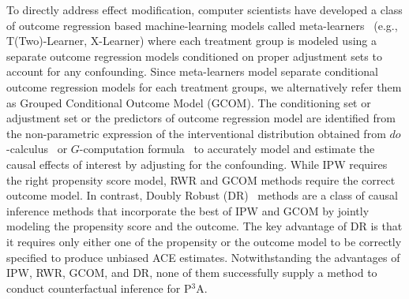 \documentclass[letterpaper]{article} %
\begin{document}
To directly address effect modification, computer scientists have developed a class of outcome regression based machine-learning models called meta-learners~\cite{kunzel2019metalearners} (e.g., T(Two)-Learner, X-Learner) where each treatment group is modeled using a separate outcome regression models conditioned on proper adjustment sets to account for any confounding.
Since meta-learners model separate conditional outcome regression models for each treatment groups, we alternatively refer them as Grouped Conditional Outcome Model (GCOM).
The conditioning set or adjustment set or the predictors of outcome regression model are identified from the non-parametric expression of the interventional distribution obtained from $do$-calculus~\cite{pearl2009causality, pearl2012docalculus} or $G$-computation formula~\cite{ROBINS1986gcom, hernan2009ipw} to accurately model and estimate the causal effects of interest by adjusting for the confounding.
While IPW requires the right propensity score model, RWR and GCOM methods require the correct outcome model. 
In contrast, Doubly Robust (DR)~\cite{bang2005doublyrobust} methods are a class of causal inference methods that incorporate the best of IPW and GCOM by jointly modeling the propensity score and the outcome. The key advantage of DR is that it requires only either one of the propensity or the outcome model to be  correctly specified to produce unbiased ACE estimates. Notwithstanding the advantages of IPW, RWR, GCOM, and DR, none of them successfully supply a method to conduct counterfactual inference for P$^3$A. 
\end{document}
